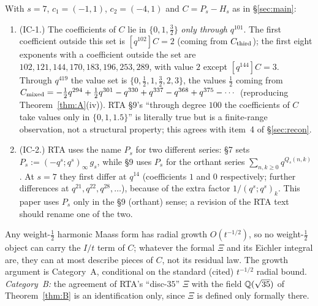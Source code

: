 \begin{proposition}\label{prop:ic12}
With $s=7$, $c_1=(-1,1)$, $c_2=(-4,1)$ and $C=P_s-H_s$ as in \S\ref{sec:main}:
\begin{enumerate}[label=(\roman*)]
\item (IC-1.) The coefficients of $C$ lie in $\{0,1,\tfrac32\}$ \emph{only through} $q^{101}$. The first coefficient outside this set is $[q^{102}]C=2$ (coming from $C_{\mathrm{third}}$); the first eight exponents with a coefficient outside the set are $102,121,144,170,183,196,253,289$, with value $2$ except $[q^{144}]C=3$. Through $q^{419}$ the value set is $\{0,\tfrac12,1,\tfrac32,2,3\}$, the values $\tfrac12$ coming from $C_{\mathrm{mixed}}=-\tfrac12q^{294}+\tfrac12q^{301}-q^{330}+q^{337}-q^{368}+q^{375}-\cdots$ (reproducing Theorem~\ref{thm:A}(iv)). RTA \S9's ``through degree $100$ the coefficients of $C$ take values only in $\{0,1,1.5\}$'' is literally true but is a finite-range observation, not a structural property; this agrees with item~4 of \S\ref{sec:recon}.
\item (IC-2.) RTA uses the name $P_s$ for two different series: \S7 sets $P_s:=(-q^s;q^s)_\infty\,g_s$, while \S9 uses $P_s$ for the orthant series $\sum_{n,k\ge0}q^{Q_s(n,k)}$. At $s=7$ they first differ at $q^{14}$ (coefficients $1$ and $0$ respectively; further differences at $q^{21},q^{22},q^{28},\dots$), because of the extra factor $1/(q^s;q^s)_k$. This paper uses $P_s$ only in the \S9 (orthant) sense; a revision of the RTA text should rename one of the two.
\end{enumerate}
\end{proposition}

\begin{remark}\label{rem:holproj8}
Any weight-$\tfrac12$ harmonic Maass form has radial growth $O(t^{-1/2})$, so no weight-$\tfrac12$ object can carry the $I/t$ term of $C$; whatever the formal $\Xi$ and its Eichler integral are, they can at most describe pieces of $C$, not its residual law. The growth argument is Category~A, conditional on the standard (cited) $t^{-1/2}$ radial bound. \emph{Category~B:} the agreement of RTA's ``disc-$35$'' $\Xi$ with the field $\mathbb{Q}(\sqrt{35})$ of Theorem~\ref{thm:B} is an identification only, since $\Xi$ is defined only formally there.
\end{remark}

